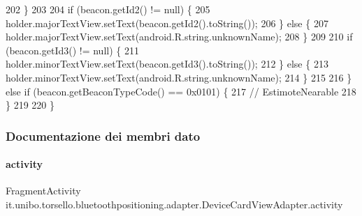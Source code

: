 \begin{DoxyCode}
202             \}
203 
204             \textcolor{keywordflow}{if} (beacon.getId2() != null) \{
205                 holder.majorTextView.setText(beacon.getId2().toString());
206             \} \textcolor{keywordflow}{else} \{
207                 holder.majorTextView.setText(android.R.string.unknownName);
208             \}
209 
210             \textcolor{keywordflow}{if} (beacon.getId3() != null) \{
211                 holder.minorTextView.setText(beacon.getId3().toString());
212             \} \textcolor{keywordflow}{else} \{
213                 holder.minorTextView.setText(android.R.string.unknownName);
214             \}
215 
216         \} \textcolor{keywordflow}{else} \textcolor{keywordflow}{if} (beacon.getBeaconTypeCode() == 0x0101) \{
217             \textcolor{comment}{// EstimoteNearable}
218         \}
219 
220     \}
\end{DoxyCode}


\subsubsection{Documentazione dei membri dato}
\hypertarget{classit_1_1unibo_1_1torsello_1_1bluetoothpositioning_1_1adapter_1_1DeviceCardViewAdapter_ad9b0572ad094da8225f1c2024ac2eb61_ad9b0572ad094da8225f1c2024ac2eb61}{}\label{classit_1_1unibo_1_1torsello_1_1bluetoothpositioning_1_1adapter_1_1DeviceCardViewAdapter_ad9b0572ad094da8225f1c2024ac2eb61_ad9b0572ad094da8225f1c2024ac2eb61} 
\paragraph{\texorpdfstring{activity}{activity}}
{\footnotesize\ttfamily Fragment\+Activity it.\+unibo.\+torsello.\+bluetoothpositioning.\+adapter.\+Device\+Card\+View\+Adapter.\+activity\hspace{0.3cm}{\ttfamily [private]}}

\hypertarget{classit_1_1unibo_1_1torsello_1_1bluetoothpositioning_1_1adapter_1_1DeviceCardViewAdapter_a0d362081de4afb44abc82197aa597a18_a0d362081de4afb44abc82197aa597a18}{}\label{classit_1_1unibo_1_1torsello_1_1bluetoothpositioning_1_1adapter_1_1DeviceCardViewAdapter_a0d362081de4afb44abc82197aa597a18_a0d362081de4afb44abc82197aa597a18} 
